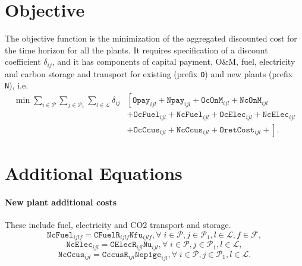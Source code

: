 \documentclass{amsart}
\begin{document}
\section{Objective}
%
The objective function is the minimization of the aggregated discounted cost for
the time horizon for all the plants. It requires specification of a discount
coefficient $\delta_{ij}$, and it has components of capital payment, O\&M, fuel,
electricity and carbon storage and transport for existing (prefix \texttt{O})
and new plants (prefix \texttt{N}), i.e.
%
\begin{equation}
    \begin{split}
        \min \sum_{i\in \mathcal{P}}
        \sum_{j\in \mathcal{P}_1}
        \sum_{l\in \mathcal{L}}
        \delta_{ij}  
        &\left[\mathtt{Opay}_{ijl} 
        + \mathtt{Npay}_{ijl} 
        + \mathtt{OcOnM}_{ijl}
        + \mathtt{NcOnM}_{ijl} \right. \\ 
        &+ \mathtt{OcFuel}_{ijl} 
        + \mathtt{NcFuel}_{ijl} 
        + \mathtt{OcElec}_{ijl} 
        + \mathtt{NcElec}_{ijl}  \\
        &\left.+ \mathtt{OcCcus}_{ijl} 
        + \mathtt{NcCcus}_{ijl}
        + \mathtt{OretCost}_{ijl} 
        + \right].
    \end{split}
\end{equation}

%

%
\appendix
%
\section{Additional Equations}
%
\paragraph{New plant additional costs} These include fuel, electricity and CO2
transport and storage.
\begin{equation}
    \mathtt{NcFuel}_{ijlf} = \mathtt{CFuelR}_{ijlf} \mathtt{Nfu}_{ijlf},
    \forall \; i \in \mathcal{P},j \in \mathcal{P}_1 ,
    l \in \mathcal{L}, f \in \mathcal{F},
\end{equation}
%
\begin{equation}
    \mathtt{NcElec}_{ijl} = \mathtt{CElecR}_{ijl} \mathtt{Nu}_{ijl},
    \forall \; i \in \mathcal{P},j \in \mathcal{P}_1 , l \in \mathcal{L},
\end{equation}
%
\begin{equation}
    \mathtt{NcCcus}_{ijl} = \mathtt{CccusR}_{ijl} \mathtt{Nep1ge}_{ijl},
    \forall \; i \in \mathcal{P},j \in \mathcal{P}_1 , l \in \mathcal{L}.
\end{equation}
\end{document}
